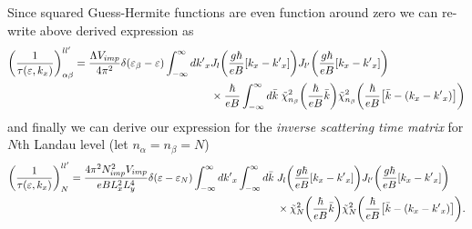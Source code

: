 Since squared Guess-Hermite functions are even function around zero we can re-write above derived expression as
\begin{equation} \label{4.65}
  \begin{aligned}
    \qty(\frac{1}{\tau(\varepsilon,k_x)})^{ll'}_{\alpha\beta} =
    \frac{\Lambda V_{imp}}{4\pi^2}
    \delta(\varepsilon_{\beta} - \varepsilon)
    \int_{-\infty}^{\infty} d {k'}_x
    &
    J_l\qty(\frac{g\hbar}{eB}[{k}_x - {k'}_x])
    J_{l'}\qty(\frac{g\hbar}{eB}[{k}_x - {k'}_x]) \\
    & \times
    \frac{\hbar }{eB}
    \int_{-\infty}^{\infty} d\bar{k} \;
    \tilde{\chi}^2_{n_{\beta}}\qty(\frac{\hbar}{eB}\bar{k})
    \tilde{\chi}^2_{n_{\beta}}\qty(\frac{\hbar}{eB}
    \qty[\bar{k} - ({k}_x  - {k'}_x)])
  \end{aligned}
\end{equation}
and finally we can derive our expression for the \textit{inverse
scattering time matrix} for $N$th Landau level (let $n_{\alpha} = n_{\beta} = N$)
\begin{equation} \label{4.66}
  \begin{aligned}
    \qty(\frac{1}{\tau(\varepsilon,k_x)})^{ll'}_{N} =
    \frac { 4\pi^2 N_{imp}^2 V_{imp}}{eB L_x^2 L_y^4}
    \delta(\varepsilon - \varepsilon_{N})
    \int_{-\infty}^{\infty} d {k'}_x
    \int_{-\infty}^{\infty} d\bar{k} \;
    &
    J_l\qty(\frac{g\hbar}{eB}[{k}_x - {k'}_x])
    J_{l'}\qty(\frac{g\hbar}{eB}[{k}_x - {k'}_x]) \\
    & \times
    \tilde{\chi}^2_{N}\qty(\frac{\hbar}{eB}\bar{k})
    \tilde{\chi}^2_{N}\qty(\frac{\hbar}{eB}
    \qty[\bar{k} - ({k}_x  - {k'}_x)]).
  \end{aligned}
\end{equation}
